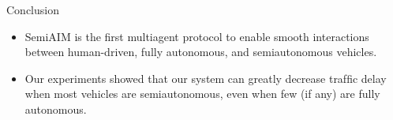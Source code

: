 \documentclass{beamer}
\begin{document}
\begin{frame}{Conclusion}
\begin{itemize}
\item SemiAIM is the first multiagent protocol to enable smooth interactions
between human-driven, fully autonomous, and semiautonomous
vehicles.\pause
\item Our experiments showed that our system can greatly decrease
trafﬁc delay when most vehicles are semiautonomous, even when few
(if any) are fully autonomous.
\end{itemize}
\end{frame}
\end{document}

